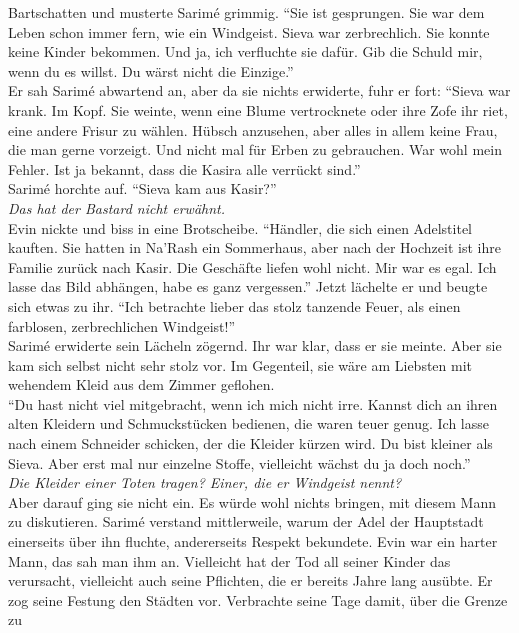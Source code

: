 Bartschatten und musterte Sarimé grimmig. ``Sie ist gesprungen. Sie war dem Leben schon immer fern, 
wie ein Windgeist. Sieva war zerbrechlich. Sie konnte keine Kinder bekommen. Und ja, ich verfluchte 
sie dafür. Gib die Schuld mir, wenn du es willst. Du wärst nicht die Einzige.''\\
Er sah Sarimé abwartend an, aber da sie nichts erwiderte, fuhr er fort: ``Sieva war krank. Im 
Kopf. Sie weinte, wenn eine Blume vertrocknete oder ihre Zofe ihr riet, eine andere Frisur zu 
wählen. Hübsch anzusehen, aber alles in allem keine Frau, die man gerne vorzeigt. Und nicht mal für 
Erben zu gebrauchen. War wohl mein Fehler. Ist ja bekannt, dass die Kasira alle verrückt sind.''\\
Sarimé horchte auf. ``Sieva kam aus Kasir?''\\
\textit{Das hat der Bastard nicht erwähnt.}\\
Evin nickte und biss in eine Brotscheibe. ``Händler, die sich einen Adelstitel kauften. Sie hatten 
in Na'Rash ein Sommerhaus, aber nach der Hochzeit ist ihre Familie zurück nach Kasir. Die Geschäfte 
liefen wohl nicht. Mir war es egal. Ich lasse das Bild abhängen, habe es ganz vergessen.'' Jetzt 
lächelte er und beugte sich etwas zu ihr. ``Ich betrachte lieber das stolz tanzende Feuer, als 
einen farblosen, zerbrechlichen Windgeist!''\\
Sarimé erwiderte sein Lächeln zögernd. Ihr war klar, dass er sie meinte. Aber sie kam sich selbst 
nicht sehr stolz vor. Im Gegenteil, sie wäre am Liebsten mit wehendem Kleid aus dem Zimmer 
geflohen.\\
``Du hast nicht viel mitgebracht, wenn ich mich nicht irre. Kannst dich an ihren alten Kleidern und 
Schmuckstücken bedienen, die waren teuer genug. Ich lasse nach einem Schneider schicken, der die 
Kleider kürzen wird. Du bist kleiner als Sieva. Aber erst mal nur einzelne Stoffe, vielleicht 
wächst du ja doch noch.''\\
\textit{Die Kleider einer Toten tragen? Einer, die er Windgeist nennt?}\\
Aber darauf ging sie nicht ein. Es würde wohl nichts bringen, mit diesem Mann zu diskutieren. 
Sarimé verstand mittlerweile, warum der Adel der Hauptstadt einerseits über ihn fluchte, 
andererseits Respekt bekundete. Evin war ein harter Mann, das sah man ihm an. Vielleicht hat der 
Tod all seiner Kinder das verursacht, vielleicht auch seine Pflichten, die er bereits Jahre lang 
ausübte. Er zog seine Festung den Städten vor. Verbrachte seine Tage damit, über die Grenze zu 
